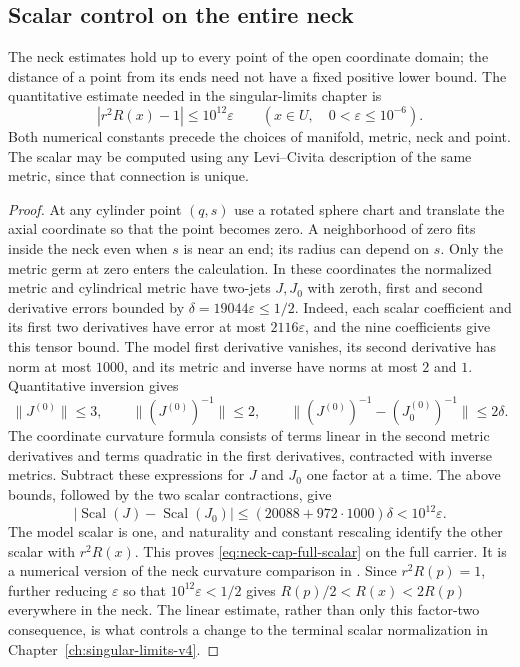 \subsection{Scalar control on the entire neck}
\label{sec:neck-cap-full-scalar}

\begin{lemma}
\label{lem:neck-cap-scalar}
The neck estimates hold up to every point of the open coordinate domain;
the distance of a point from its ends need not have a fixed positive lower
bound.  The quantitative estimate needed in the singular-limits chapter is
\begin{equation}
 |r^2R(x)-1|\le 10^{12}\varepsilon
 \qquad(x\in U,\quad 0<\varepsilon\le10^{-6}).
 \label{eq:neck-cap-full-scalar}
\end{equation}
Both numerical constants precede the choices of manifold, metric, neck and
point.  The scalar may be computed using any Levi--Civita description of
the same metric, since that connection is unique.
\end{lemma}

\begin{proof}
At any cylinder
point $(q,s)$ use a rotated sphere chart and translate the axial coordinate
so that the point becomes zero.  A neighborhood of zero fits inside the
neck even when $s$ is near an end; its radius can depend on $s$.  Only the
metric germ at zero enters the calculation.  In these coordinates the
normalized metric and cylindrical metric have two-jets $J,J_0$ with
zeroth, first and second derivative errors bounded by
$\delta=19044\varepsilon\le1/2$.  Indeed, each scalar coefficient and
its first two derivatives have error at most $2116\varepsilon$, and
the nine coefficients give this tensor bound.  The model first derivative
vanishes, its second derivative has norm at most $1000$, and its metric
and inverse have norms at most $2$ and $1$.  Quantitative inversion gives
\[
 \|J^{(0)}\|\le3,\qquad
 \|(J^{(0)})^{-1}\|\le2,\qquad
 \|(J^{(0)})^{-1}-(J_0^{(0)})^{-1}\|\le2\delta.
\]
The coordinate curvature formula consists of terms linear in the second
metric derivatives and terms quadratic in the first derivatives, contracted
with inverse metrics.  Subtract these expressions for $J$ and $J_0$ one
factor at a time.  The above bounds, followed by the two scalar contractions,
give
\[
 |\operatorname{Scal}(J)-\operatorname{Scal}(J_0)|
 \le(20088+972\cdot1000)\delta<10^{12}\varepsilon.
\]
The model scalar is one, and naturality and constant rescaling identify the
other scalar with $r^2R(x)$.  This proves
\eqref{eq:neck-cap-full-scalar} on the full carrier.  It is a numerical
version of the neck curvature comparison in
\cite[Lemma A.2, pp.~497--498; Proposition A.11, pp.~503--504]{MT2007}.
Since $r^2R(p)=1$, further reducing $\varepsilon$ so that
$10^{12}\varepsilon<1/2$ gives
$R(p)/2<R(x)<2R(p)$ everywhere in the neck.  The linear estimate, rather
than only this factor-two consequence, is what controls a change to the
terminal scalar normalization in Chapter~\ref{ch:singular-limits-v4}.
\end{proof}

